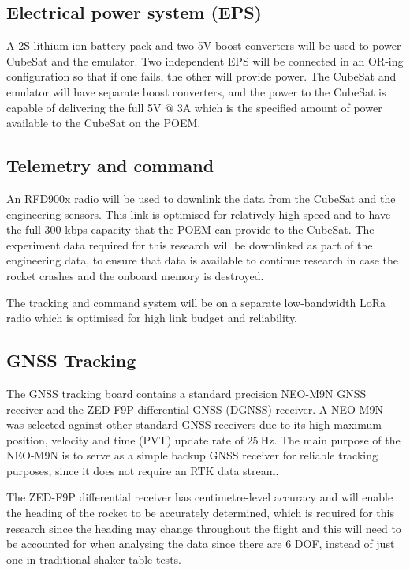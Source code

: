 \documentclass[a4paper,11pt]{article}
\begin{document}

\subsection{Electrical power system (EPS)}
A 2S lithium-ion battery pack and two 5V boost converters will be used to power CubeSat and the emulator. Two independent EPS will be connected in an OR-ing configuration so that if one fails, the other will provide power. The CubeSat and emulator will have separate boost converters, and the power to the CubeSat is capable of delivering the full 5V @ 3A which is the specified amount of power available to the CubeSat on the POEM.

\subsection{Telemetry and command}
An RFD900x radio will be used to downlink the data from the CubeSat and the engineering sensors. This link is optimised for relatively high speed and to have the full 300 kbps capacity that the POEM can provide to the CubeSat. The experiment data required for this research will be downlinked as part of the engineering data, to ensure that data is available to continue research in case the rocket crashes and the onboard memory is destroyed.

The tracking and command system will be on a separate low-bandwidth LoRa radio which is optimised for high link budget and reliability.


\subsection{GNSS Tracking}

The GNSS tracking board contains a standard precision NEO-M9N GNSS receiver and the ZED-F9P differential GNSS (DGNSS) receiver. A NEO-M9N was selected against other standard GNSS receivers due to its high maximum position, velocity and time (PVT) update rate of $\SI{25}{\hertz}$. The main purpose of the NEO-M9N is to serve as a simple backup GNSS receiver for reliable tracking purposes, since it does not require an RTK data stream.

The ZED-F9P differential receiver has centimetre-level accuracy and will enable the heading of the rocket to be accurately determined, which is required for this research since the heading may change throughout the flight and this will need to be accounted for when analysing the data since there are 6 DOF, instead of just one in traditional shaker table tests.
\end{document}

